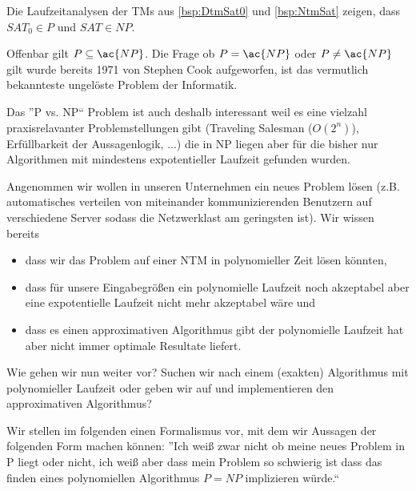 \begin{Bemerkung}
 Die Laufzeitanalysen der \ac{TM}s aus \autoref{bsp:DtmSat0} und \autoref{bsp:NtmSat} zeigen, dass $SAT_0\in P$ und $SAT\in NP$.
\end{Bemerkung}


Offenbar gilt $P\subseteq \ac{NP}$.
Die Frage ob $P=\ac{NP}$ oder $P\neq \ac{NP}$ gilt wurde bereits 1971 von Stephen Cook aufgeworfen, ist das vermutlich bekannteste ungelöste Problem der Informatik.

Das ''P vs. NP`` Problem ist auch deshalb interessant weil es eine vielzahl praxisrelavanter Problemstellungen gibt (Traveling Salesman ($O(2^n)$), Erfüllbarkeit der Aussagenlogik, ...)
die in NP liegen aber für die bisher nur Algorithmen mit mindestens expotentieller Laufzeit gefunden wurden.

Angenommen wir wollen in unseren Unternehmen ein neues Problem lösen 
(z.B. automatisches verteilen von miteinander kommunizierenden Benutzern auf verschiedene Server sodass die Netzwerklast am geringsten ist).
Wir wissen bereits 
\begin{itemize}
 \item dass wir das Problem auf einer NTM in polynomieller Zeit lösen könnten,
 \item dass für unsere Eingabegrößen ein polynomielle Laufzeit noch akzeptabel aber eine expotentielle Laufzeit nicht mehr akzeptabel wäre und
 \item dass es einen approximativen Algorithmus gibt der polynomielle Laufzeit hat aber nicht immer optimale Resultate liefert.
\end{itemize}
Wie gehen wir nun weiter vor? Suchen wir nach einem (exakten) Algorithmus mit polynomieller Laufzeit oder geben wir auf und implementieren den approximativen Algorithmus?

Wir stellen im folgenden einen Formalismus vor,
mit dem wir 
Aussagen der folgenden Form machen können:
''Ich weiß zwar nicht ob meine neues Problem in P liegt oder nicht,
ich weiß aber dass mein Problem so schwierig ist dass das finden eines polynomiellen Algorithmus $P=NP$ implizieren würde.``


